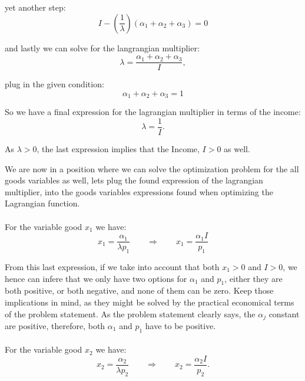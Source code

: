 \documentclass{article}
\begin{document}
yet another step:
\begin{equation}
   I - \left( \frac{1}{\lambda} \right) (\alpha_1 + \alpha_2+ \alpha_3) = 0
\end{equation}

and lastly we can solve for the langrangian multiplier:
\begin{equation}
   \lambda =  \frac{\alpha_1 + \alpha_2+ \alpha_3}{I},
\end{equation}

plug in the given condition:
\begin{equation}
  \alpha_1 + \alpha_2+ \alpha_3 = 1
\end{equation}

So we have a final expression for the lagrangian multiplier in terms of the income:
\begin{equation}
   \lambda =  \frac{1}{I}.
\end{equation}

As $\lambda > 0$, the last expression implies that the Income, $I > 0$ as well.

\medskip

We are now in a position where we can solve the optimization problem for the all goods variables as well, lets plug the found expression of the lagrangian multiplier, into the goods variables expressions found when optimizing the Lagrangian function.

\paragraph{}
For the variable good $x_1$ we have:
\begin{equation}\label{opt1}
  x_1 = \frac{\alpha_1}{\lambda p_1} \qquad \Rightarrow \qquad x_1 = \frac{\alpha_1 I}{ p_1}
\end{equation}

From this last expression, if we take into account that both $x_1 > 0$ and $I > 0$, we hence can infere that we only have two options for $\alpha_1$ and $p_1$, either they are both positive, or both negative, and none of them can be zero. Keep those implications in mind, as they might be solved by the practical economical terms of the problem statement. As the problem statement clearly says, the $\alpha_j$ constant are positive, therefore, both $\alpha_1$ and $p_1$ have to be positive.

\paragraph{}
For the variable good $x_2$ we have:
\begin{equation}\label{opt2}
  x_2 = \frac{\alpha_2}{\lambda p_2} \qquad \Rightarrow \qquad x_2 = \frac{\alpha_2 I}{ p_2}.
\end{equation}
\end{document}
